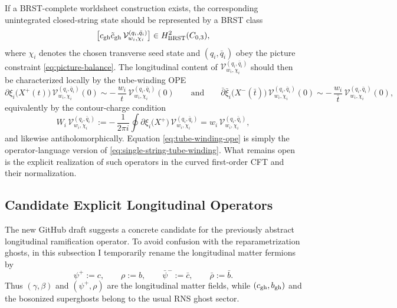 \documentclass[11pt]{article}
\newcommand{\mc}[1]{\mathcal{#1}}
\begin{document}
If a BRST-complete worldsheet construction exists, the corresponding unintegrated closed-string state should be represented by a BRST class
\begin{equation}\label{eq:single-string-brst-class}
\big[c_{\rm gh}\tilde c_{\rm gh}\,\mc V^{(q_i,\bar q_i)}_{w_i,\chi_i}\big]
\in
H^2_{\rm BRST}(C_{0,3}),
\end{equation}
where $\chi_i$ denotes the chosen transverse seed state and $(q_i,\bar q_i)$ obey the picture constraint \eqref{eq:picture-balance}. The longitudinal content of $\mc V^{(q_i,\bar q_i)}_{w_i,\chi_i}$ should then be characterized locally by the tube-winding OPE
\begin{equation}\label{eq:tube-winding-ope}
\partial \xi_i\!\big(X^+(t)\big)\,
\mc V^{(q_i,\bar q_i)}_{w_i,\chi_i}(0)
\sim
-\,\frac{w_i}{t}\,
\mc V^{(q_i,\bar q_i)}_{w_i,\chi_i}(0)
\qquad
\text{and}
\qquad
\bar\partial \bar\xi_i\!\big(X^-(\bar t)\big)\,
\mc V^{(q_i,\bar q_i)}_{w_i,\chi_i}(0)
\sim
-\,\frac{w_i}{\bar t}\,
\mc V^{(q_i,\bar q_i)}_{w_i,\chi_i}(0),
\end{equation}
equivalently by the contour-charge condition
\begin{equation}\label{eq:tube-winding-charge}
W_i\,\mc V^{(q_i,\bar q_i)}_{w_i,\chi_i}
:=
-\,\frac{1}{2\pi i}\oint \partial \xi_i\!\big(X^+\big)\,
\mc V^{(q_i,\bar q_i)}_{w_i,\chi_i}
=
w_i\,\mc V^{(q_i,\bar q_i)}_{w_i,\chi_i},
\end{equation}
and likewise antiholomorphically. Equation \eqref{eq:tube-winding-ope} is simply the operator-language version of \eqref{eq:single-string-tube-winding}. What remains open is the explicit realization of such operators in the curved first-order CFT and their normalization.

\subsection{Candidate Explicit Longitudinal Operators}

The new GitHub draft suggests a concrete candidate for the previously abstract longitudinal ramification operator. To avoid confusion with the reparametrization ghosts, in this subsection I temporarily rename the longitudinal matter fermions by
\begin{equation}\label{eq:longitudinal-fermion-rename}
\psi^+:=c,
\qquad
\rho:=b,
\qquad
\bar\psi^-:=\bar c,
\qquad
\bar\rho:=\bar b.
\end{equation}
Thus $(\gamma,\beta)$ and $(\psi^+,\rho)$ are the longitudinal matter fields, while $(c_{\rm gh},b_{\rm gh})$ and the bosonized superghosts belong to the usual RNS ghost sector.
\end{document}
